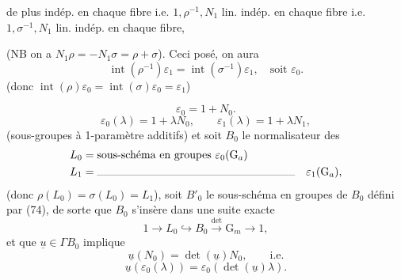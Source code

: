 
 de plus  indép. en chaque fibre i.e. $1,\rho^{-1},N_1$ lin. indép. en chaque fibre i.e. $1,\sigma^{-1},N_1$ lin. indép. en chaque fibre, 



(NB on a $N_1\rho=-N_1\sigma=\rho+\sigma$). Ceci posé, on aura
\[
\operatorname{int}(\rho^{-1})\varepsilon_1=\operatorname{int}(\sigma^{-1})\varepsilon_1,\quad\text{soit }\varepsilon_0.
\]
(donc $\operatorname{int}(\rho)\varepsilon_0=\operatorname{int}(\sigma)\varepsilon_0=\varepsilon_1$)

\[
\varepsilon_0=1+N_0.
\]
 
\[
\varepsilon_0(\lambda)=1+\lambda N_0,\qquad\varepsilon_1(\lambda)=1+\lambda N_1,
\]
(sous-groupes à 1-paramètre additifs)
et soit $B_0$ le  normalisateur  des
\[
\begin{aligned}
L_0&=\text{sous-schéma en groupes }\varepsilon_0(\mathrm G_a)\\
L_1&=\text{\rule{6.3cm}{0.2pt}}\quad\varepsilon_1(\mathrm G_a),
\end{aligned}
\]
(donc $\rho(L_0)=\sigma(L_0)=L_1$),
soit $B'_0$ le sous-schéma en groupes de $B_0$ défini  par (74), de sorte que $B_0$ s'insère dans une suite exacte
\[
1\longrightarrow L_0\hookrightarrow B_0\xrightarrow{\det}\mathrm G_m\longrightarrow1,
\]
et que $\underline u\in\Gamma B_0$ implique
\[
\underline u(N_0)=\det(\underline u)N_0,\qquad\text{i.e.}
\]
\[
\underline u(\varepsilon_0(\lambda))=\varepsilon_0(\det(\underline u)\lambda).
\]

